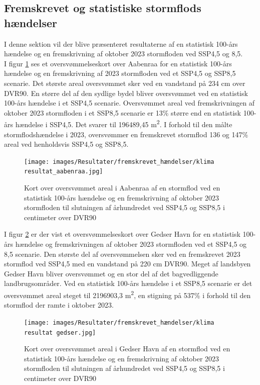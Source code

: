 \subsection{Fremskrevet og statistiske stormflods hændelser}

I denne sektion vil der blive præsenteret resultaterne  af en statistisk 100-års hændelse og en fremskrivning af oktober 2023 stormfloden ved SSP4,5 og 8,5. \\

I figur \ref{Figur: Klima Aabenraa} ses et oversvømmelseskort over Aabenraa for en statistisk 100-års hændelse og en fremskrivning af 2023 stormfloden ved et SSP4,5 og SSP8,5 scenarie. Det største areal oversvømmet sker ved en vandstand på 234 cm over DVR90. En større del af den sydlige bydel bliver oversvømmet ved en statistisk 100-års hændelse i et SSP4,5 scenarie. Oversvømmet areal ved fremskrivningen af oktober 2023 stormfloden i et SSP8,5 scenarie er 13\% større end en statistisk 100-års hændelse i SSP4,5. Det svarer til 196489,45 m\textsuperscript{2}. I forhold til den målte stormflodshændelse i 2023, oversvømmer en fremskrevet stormflod 136 og 147\% areal ved henholdsvis SSP4,5 og SSP8,5.
\begin{figure}[H]
    \centering
    \texttt{[image: images/Resultater/fremskrevet\_hændelser/klima resultat\_aabenraa.jpg]}
    \caption{Kort over oversvømmet areal i Aabenraa af en stormflod ved en statistisk 100-års hændelse og en fremskrivning af oktober 2023 stormfloden til slutningen af århundredet ved SSP4,5 og SSP8,5 i centimeter over DVR90}
    \label{Figur: Klima Aabenraa}
\end{figure}

I figur \ref{Figur: Klima Gedser Havn} er der vist et oversvømmelseskort over Gedser Havn for en statistisk 100-års hændelse og fremskrivningen af oktober 2023 stormfloden ved et SSP4,5 og 8,5 scenarie. Den største del af oversvømmelsen sker ved en fremskrevet 2023 stormflod ved SSP4,5 med en vandstand på 220 cm DVR90. Meget af landsbyen Gedser Havn bliver oversvømmet og en stor del af det bagvedliggende landbrugsområder. Ved en statistisk 100-års hændelse i et SSP8,5 scenarie er det oversvømmet areal steget til 2196903,3 m\textsuperscript{2}, en stigning på 537\% i forhold til den stormflod der ramte i oktober 2023. 

\begin{figure}[H]
    \centering
    \texttt{[image: images/Resultater/fremskrevet\_hændelser/klima resultat gedser.jpg]}
    \caption{Kort over oversvømmet areal i Gedser Havn af en stormflod ved en statistisk 100-års hændelse og en fremskrivning af oktober 2023 stormfloden til slutningen af århundredet ved SSP4,5 og SSP8,5 i centimeter over DVR90}
    \label{Figur: Klima Gedser Havn}
\end{figure}

